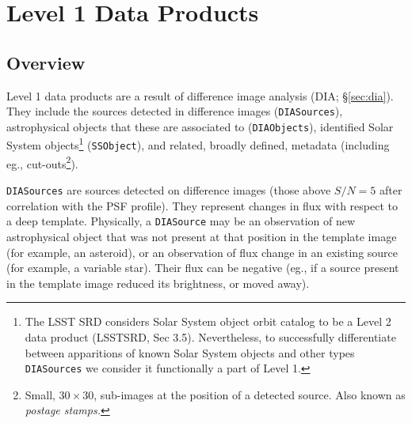 \documentclass[12pt]{article}
\newcommand{\code}[1]{\texttt{#1}}
\newcommand{\DIASource}{\code{DIASource}\xspace}
\newcommand{\DIASources}{\code{DIASources}\xspace}
\newcommand{\DIAObjects}{\code{DIAObjects}\xspace}
\newcommand{\SSObject}{\code{SSObject}\xspace}
\begin{document}


\section{Level 1 Data Products}

\subsection{Overview}

Level 1 data products are a result of difference image analysis (DIA; \S \ref{sec:dia}). They include the sources detected in difference images (\DIASources), astrophysical objects that these are associated to (\DIAObjects), identified Solar System objects\footnote{The LSST SRD considers Solar System object orbit catalog to be a Level 2 data product (LSSTSRD, Sec 3.5). Nevertheless, to successfully differentiate between apparitions of known Solar System objects and other types \DIASources we consider it functionally a part of Level 1.} (\SSObject), and related, broadly defined, metadata (including eg., cut-outs\footnote{Small, $30 \times 30$, sub-images at the position of a detected source. Also known as {\em postage stamps.}}).

\DIASources are sources detected on difference images (those above $S/N=5$ after correlation with the PSF profile). They represent changes in flux with respect to a deep template. Physically, a \DIASource may be an observation of new astrophysical object that was not present at that position in the template image (for example, an asteroid), or an observation of flux change in an existing source (for example, a variable star). Their flux can be negative (eg., if a source present in the template image reduced its brightness, or moved away).
\end{document}
